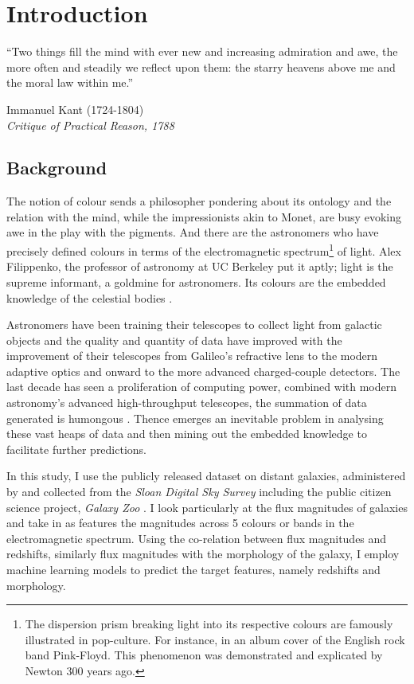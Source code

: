 \twocolumn
\section{Introduction}
\epigraph{\small \justify``Two things fill the mind with ever new and increasing admiration and awe, the more often and steadily we reflect upon them: the starry heavens above me and the moral law within me.''}{Immanuel Kant (1724-1804)\\\textit{Critique of Practical Reason, 1788}}

\subsection{Background}
The notion of colour sends a philosopher pondering about its ontology and the relation with the mind, while the impressionists akin to Monet, are busy evoking awe in the play with the pigments. And there are the astronomers who have precisely defined colours in terms of the electromagnetic spectrum\footnote{The dispersion prism breaking light into its respective colours are famously illustrated in pop-culture. For instance, in an album cover of the English rock band Pink-Floyd. This phenomenon was demonstrated and explicated by Newton 300 years ago.} of light. Alex Filippenko, the professor of astronomy at UC Berkeley put it aptly; light is the supreme informant, a goldmine for astronomers. Its colours are the embedded knowledge of the celestial bodies \parencite[96]{filippenko_great_2007}.

Astronomers have been training their telescopes to collect light from galactic objects and the quality and quantity of data have improved with the improvement of their telescopes from Galileo's refractive lens to the modern adaptive optics and onward to the more advanced charged-couple detectors. The last decade has seen a proliferation of computing power, combined with modern astronomy's advanced high-throughput telescopes, the summation of data generated is humongous \parencite[43]{ivezic_statistics_2014}. Thence emerges an inevitable problem in analysing these vast heaps of data and then mining out the embedded knowledge to facilitate further predictions.

In this study, I use the publicly released dataset on distant galaxies, administered by and collected from the \emph{Sloan Digital Sky Survey} \parencite{stoughton_sloan_2002} including the public citizen science project, \emph{Galaxy Zoo} \parencite{lintott_galaxy_2008, raddick_galaxy_2010, lintott_galaxy_2011, raddick_galaxy_2013}. I look particularly at the flux magnitudes of galaxies and take in as features the magnitudes across 5 colours or bands in the electromagnetic spectrum. Using the co-relation between flux magnitudes and redshifts, similarly flux magnitudes with the morphology of the galaxy, I employ machine learning models to predict the target features, namely redshifts and morphology.

